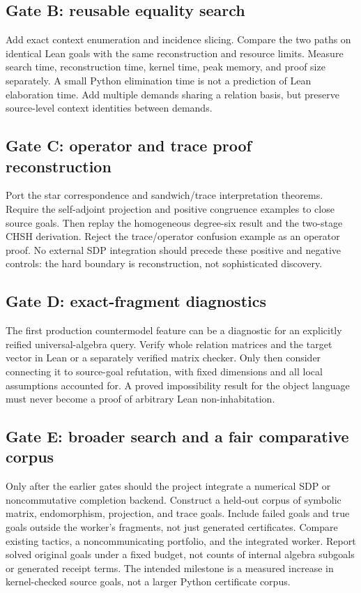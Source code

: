 \subsection{Gate B: reusable equality search}

Add exact context enumeration and incidence slicing. Compare the two paths on
identical Lean goals with the same reconstruction and resource limits. Measure
search time, reconstruction time, kernel time, peak memory, and proof size
separately. A small Python elimination time is not a prediction of Lean
elaboration time. Add multiple demands sharing a relation basis, but preserve
source-level context identities between demands.

\subsection{Gate C: operator and trace proof reconstruction}

Port the star correspondence and sandwich/trace interpretation theorems.
Require the self-adjoint projection and positive congruence examples to close
source goals. Then replay the homogeneous degree-six result and the two-stage
CHSH derivation. Reject the trace/operator confusion example as an operator
proof. No external SDP integration should precede these positive and negative
controls: the hard boundary is reconstruction, not sophisticated discovery.

\subsection{Gate D: exact-fragment diagnostics}

The first production countermodel feature can be a diagnostic for an explicitly
reified universal-algebra query. Verify whole relation matrices and the target
vector in Lean or a separately verified matrix checker. Only then consider
connecting it to source-goal refutation, with fixed dimensions and all local
assumptions accounted for. A proved impossibility result for the object language
must never become a proof of arbitrary Lean non-inhabitation.

\subsection{Gate E: broader search and a fair comparative corpus}

Only after the earlier gates should the project integrate a numerical SDP or
noncommutative completion backend. Construct a held-out corpus of symbolic
matrix, endomorphism, projection, and trace goals. Include failed goals and true
goals outside the worker's fragments, not just generated certificates.
Compare existing tactics, a noncommunicating portfolio, and the integrated
worker. Report solved original goals under a fixed budget, not counts of
internal algebra subgoals or generated receipt terms. The intended milestone
is a measured increase in kernel-checked source goals, not a larger Python
certificate corpus.
